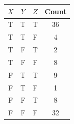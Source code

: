 \documentclass[a4paper]{article}
\theoremstyle{definition}
\begin{document}
\begin{table}[H]
        \centering
                \begin{tabular}{cccc}
                           $X$ & $Y$ & $Z$ & Count \\
                                \hline
                                T & T & T & 36 \\
                                \hline
                                T & T & F & 4 \\
                                \hline
                                T & F & T & 2 \\
                                \hline
                                T & F & F & 8 \\
                                \hline
                                F & T & T & 9 \\
                                \hline
                                F & T & F & 1 \\
                                \hline
                                F & F & T & 8 \\
                                \hline
                                F & F & F & 32 \\
                                \hline
                \end{tabular}
\end{table}
\end{document}
